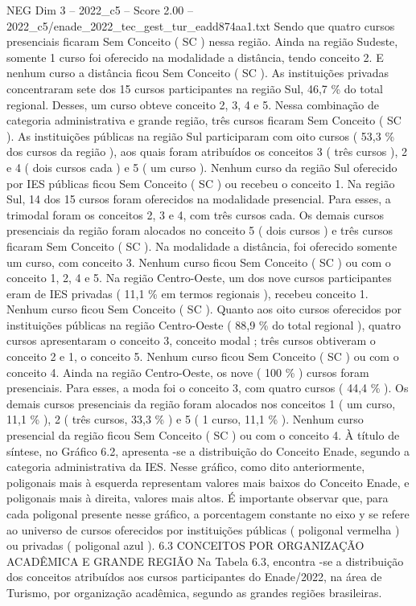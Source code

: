 \begin{textsample}{NEG Dim 3 – 2022\_c5 – Score 2.00 – 2022\_c5/enade\_2022\_tec\_gest\_tur\_eadd874aa1.txt}
Sendo que quatro cursos presenciais ficaram Sem Conceito ( SC ) nessa região.
Ainda na região Sudeste, somente 1 curso foi oferecido na modalidade a distância, tendo conceito 2.
E nenhum curso a distância ficou Sem Conceito ( SC ).
As instituições privadas concentraram sete dos 15 cursos participantes na região Sul, 46,7 \% do total regional.
Desses, um curso obteve conceito 2, 3, 4 e 5.
Nessa combinação de categoria administrativa e grande região, três cursos ficaram Sem Conceito ( SC ).
As instituições públicas na região Sul participaram com oito cursos ( 53,3 \% dos cursos da região ), aos quais foram atribuídos os conceitos 3 ( três cursos ), 2 e 4 ( dois cursos cada ) e 5 ( um curso ).
Nenhum curso da região Sul oferecido por IES públicas ficou Sem Conceito ( SC ) ou recebeu o conceito 1.
Na região Sul, 14 dos 15 cursos foram oferecidos na modalidade presencial.
Para esses, a trimodal foram os conceitos 2, 3 e 4, com três cursos cada.
Os demais cursos presenciais da região foram alocados no conceito 5 ( dois cursos ) e três cursos ficaram Sem Conceito ( SC ).
Na modalidade a distância, foi oferecido somente um curso, com conceito 3.
Nenhum curso ficou Sem Conceito ( SC ) ou com o conceito 1, 2, 4 e 5.
Na região Centro-Oeste, um dos nove cursos participantes eram de IES privadas ( 11,1 \% em termos regionais ), recebeu conceito 1.
Nenhum curso ficou Sem Conceito ( SC ).
Quanto aos oito cursos oferecidos por instituições públicas na região Centro-Oeste ( 88,9 \% do total regional ), quatro cursos apresentaram o conceito 3, conceito modal ; três cursos obtiveram o conceito 2 e 1, o conceito 5.
Nenhum curso ficou Sem Conceito ( SC ) ou com o conceito 4.
Ainda na região Centro-Oeste, os nove ( 100 \% ) cursos foram presenciais.
Para esses, a moda foi o conceito 3, com quatro cursos ( 44,4 \% ).
Os demais cursos presenciais da região foram alocados nos conceitos 1 ( um curso, 11,1 \% ), 2 ( três cursos, 33,3 \% ) e 5 ( 1 curso, 11,1 \% ).
Nenhum curso presencial da região ficou Sem Conceito ( SC ) ou com o conceito 4.
À título de síntese, no Gráfico 6.2, apresenta -se a distribuição do Conceito Enade, segundo a categoria administrativa da IES.
Nesse gráfico, como dito anteriormente, poligonais mais à esquerda representam valores mais baixos do Conceito Enade, e poligonais mais à direita, valores mais altos.
É importante observar que, para cada poligonal presente nesse gráfico, a porcentagem constante no eixo y se refere ao universo de cursos oferecidos por instituições públicas ( poligonal vermelha ) ou privadas ( poligonal azul ). 6.3 CONCEITOS POR ORGANIZAÇÃO ACADÊMICA E GRANDE REGIÃO Na Tabela 6.3, encontra -se a distribuição dos conceitos atribuídos aos cursos participantes do Enade/2022, na área de Turismo, por organização acadêmica, segundo as grandes regiões brasileiras.

\end{textsample}
